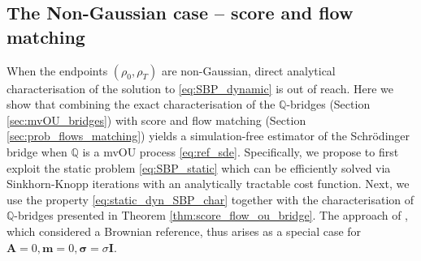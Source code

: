 \documentclass{article}
\newcommand{\Id}{\mathbf{I}}
\theoremstyle{newstyle}
\begin{document}
\subsection{The Non-Gaussian case -- score and flow matching}
When the endpoints $(\rho_0, \rho_T)$ are non-Gaussian, direct analytical characterisation of the solution to \eqref{eq:SBP_dynamic} is out of reach. Here we show that combining the exact characterisation of the $\mathbb{Q}$-bridges (Section \ref{sec:mvOU_bridges}) with score and flow matching (Section \ref{sec:prob_flows_matching}) yields a simulation-free estimator of the Schr\"odinger bridge when $\mathbb{Q}$ is a mvOU process \eqref{eq:ref_sde}. Specifically, we propose to first exploit the static problem \eqref{eq:SBP_static} which can be efficiently solved via Sinkhorn-Knopp iterations \cite{cuturi2013sinkhorn} with an analytically tractable cost function. Next, we use the property \eqref{eq:static_dyn_SBP_char} together with the characterisation of $\mathbb{Q}$-bridges presented in Theorem \ref{thm:score_flow_ou_bridge}. The approach of \cite{tong2023simulation}, which considered a Brownian reference, thus arises as a special case for $\bm{A} = 0, \bm{m} = 0, \bm{\sigma} = \sigma \Id$.
\end{document}
